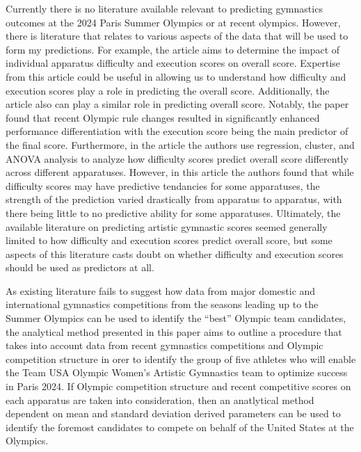 \documentclass[12pt]{article}
\begin{document}
Currently there is no literature available relevant to predicting gymnastics outcomes at the 2024 
Paris Summer Olympics or at recent olympics. However, there is literature that relates to various aspects of 
the data that will be used to form my predictions. For example, the article \citet{ScienceOfGymnastics2021} aims to determine the 
impact of individual apparatus difficulty and execution scores on overall score. 
Expertise from this article could be useful in allowing us to understand how difficulty and execution scores 
play a role in predicting the overall score. Additionally, the article \citet{JonasRohleder2023} 
also can play a similar role in predicting overall 
score. Notably, the paper found that recent Olympic rule changes resulted in significantly enhanced performance 
differentiation with the execution score being the main predictor of the final score. 
Furthermore, in the article \citet{ApparatusDifficulty2010} the authors use regression, cluster, and ANOVA analysis to 
analyze how difficulty scores predict overall score differently across different apparatuses. However, in this 
article the authors found that while difficulty scores may have predictive tendancies for some apparatuses, 
the strength of the prediction varied drastically from apparatus to apparatus, with there being little to no 
predictive ability for some apparatuses. Ultimately, the available literature on predicting artistic 
gymnastic scores seemed generally limited to how difficulty and execution scores predict overall score, 
but some aspects of this literature casts doubt on whether difficulty and execution scores should be 
used as predictors at all.



As existing literature fails to suggest how data from major domestic and international gymnastics competitions 
from the seasons leading up to the Summer Olympics can be used to identify the ``best'' Olympic team candidates, 
the analytical method presented in this paper aims to outline a procedure that takes into account data from recent 
gymnastics competitions and Olympic competition structure in orer to identify the group of five athletes who will 
enable the Team USA Olympic Women’s Artistic Gymnastics team to optimize success in Paris 2024. If Olympic 
competition structure and recent competitive scores on each apparatus are taken into consideration, then an 
anatlytical method dependent on mean and standard deviation derived parameters can be used to identify the foremost 
candidates to compete on behalf of the United States at the Olympics.
\end{document}
